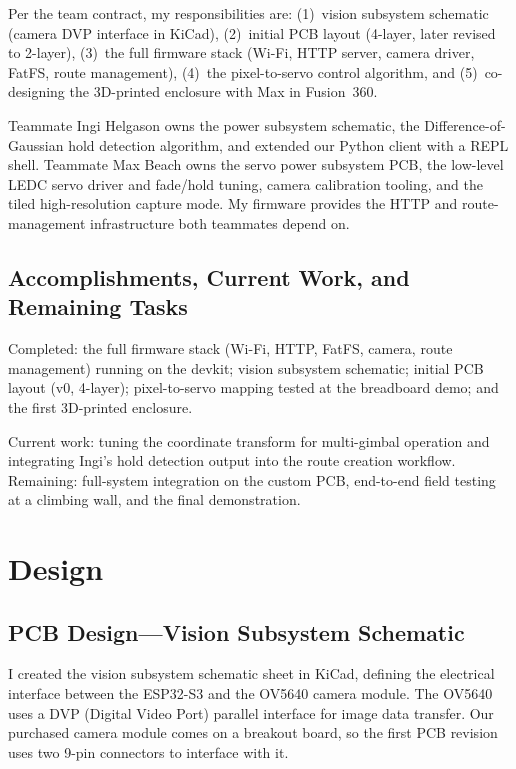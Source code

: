 \documentclass[12pt]{article}
\begin{document}
Per the team contract, my responsibilities are: (1)~vision subsystem schematic
(camera DVP interface in KiCad), (2)~initial PCB layout (4-layer, later
revised to 2-layer), (3)~the full firmware stack (Wi-Fi, HTTP server, camera
driver, FatFS, route management), (4)~the pixel-to-servo control algorithm,
and (5)~co-designing the 3D-printed enclosure with Max in Fusion~360.

Teammate Ingi Helgason owns the power subsystem schematic, the
Difference-of-Gaussian hold detection algorithm, and extended our Python
client with a REPL shell.  Teammate Max Beach owns the servo power subsystem
PCB, the low-level LEDC servo driver and fade/hold tuning, camera calibration
tooling, and the tiled high-resolution capture mode.  My firmware provides
the HTTP and route-management infrastructure both teammates depend on.

\subsection{Accomplishments, Current Work, and Remaining Tasks}

Completed: the full firmware stack (Wi-Fi, HTTP, FatFS, camera, route
management) running on the devkit; vision subsystem schematic; initial PCB
layout (v0, 4-layer); pixel-to-servo mapping tested at the breadboard demo;
and the first 3D-printed enclosure.

Current work: tuning the coordinate transform for multi-gimbal operation and
integrating Ingi's hold detection output into the route creation workflow.
Remaining: full-system integration on the custom PCB, end-to-end field
testing at a climbing wall, and the final demonstration.


\section{Design}

\subsection{PCB Design---Vision Subsystem Schematic}

I created the vision subsystem schematic sheet in KiCad, defining the
electrical interface between the ESP32-S3 and the OV5640 camera module.  The
OV5640 uses a DVP (Digital Video Port) parallel interface for image data
transfer.  Our purchased camera module comes on a breakout board, so the first
PCB revision uses two 9-pin connectors to interface with it.
\end{document}
